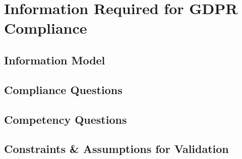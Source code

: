 \chapter{Information Required for GDPR Compliance}
\label{chapter:information}

\section{Information Model}\label{sec:info:model}

\section{Compliance Questions}\label{sec:info:compliance-questions}

\section{Competency Questions}\label{sec:info:competency-questions}

\section{Constraints \& Assumptions for Validation}\label{sec:info:constraints}